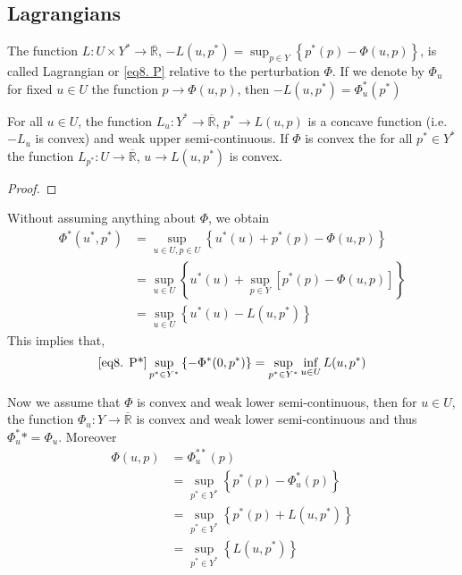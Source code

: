 \subsection{Lagrangians}
\begin{definition}
	The function $L:U\times Y^* \rightarrow \overline{\mathbb{R}}$, $-L(u, p^*)=\sup_{p\in Y} \left\lbrace p^*(p) - \Phi(u, p)
	\right\rbrace$, is called Lagrangian or \eqref{eq8. P} relative to the perturbation $\Phi$. If we denote by $\Phi_u$ for fixed $u\in U$ the function $p\rightarrow \Phi(u, p)$, then $-L(u, p^*)=\Phi^*_u(p^*)$
\end{definition}

\begin{lemma}
	For all $u\in U$, the function $L_u: Y^* \rightarrow \overline{\mathbb{R}}$, $p^*\rightarrow L(u, p)$ is  a concave function (i.e. $-L_u$ is convex) and weak upper semi-continuous. If $\Phi$ is convex the for all $p^* \in Y^*$ the function $L_{p^*}: U\rightarrow \overline{\mathbb{R}}$, $u\rightarrow L(u, p^*)$ is convex.
	\begin{proof}

	\end{proof}
\end{lemma}

Without assuming anything about $\Phi$, we obtain
\begin{align*}
	\Phi^*(u^*, p^*) &= \sup_{u\in U, p\in U} \left\lbrace u^*(u) + p^*(p) - \Phi(u,p) \right\rbrace \\
	&= \sup_{u\in U} \left\lbrace u^*(u) + \sup_{p\in Y}\left[p^*(p) - \Phi(u,p)\right]
	\right\rbrace \\
	&= \sup_{u \in U}\left\lbrace  u^*(u)-L(u, p^*) \right\rbrace
\end{align*}
This implies that,
\[
	\eqref{eq8. P*} \sup_{p^* \in Y^*} \left\lbrace -\Phi^*(0, p^*) \right\rbrace = \sup_{p^* \in Y^*} \inf_{u \in U} L(u, p^*)
\]

Now we assume that $\Phi$ is convex and weak lower semi-continuous, then for $u\in U$, the function 
$\Phi_u : Y \rightarrow \overline{\mathbb{R}}$ is convex and weak lower semi-continuous and thus $\Phi_u^** =\Phi_u$. Moreover
\begin{align*}
	\Phi(u,p)&=\Phi_u^{**}(p) \\
	&=\sup_{p^* \in Y^*}\left\lbrace
	p^*(p)-\Phi_u^*(p)
	\right\rbrace\\ 
	&=\sup_{p^*\in Y^*}\left\lbrace
	p^*(p)+L(u, p^*)
	\right\rbrace \\
	&=\sup_{p^*\in Y^*}\left\lbrace L(u, p^*)\right\rbrace
\end{align*}


